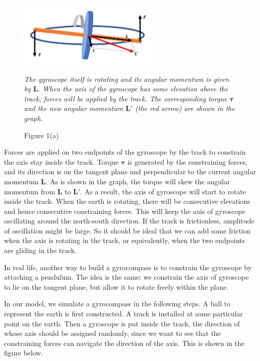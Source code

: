 \documentclass[12pt]{article}
\renewcommand{\(}{\left (}
\renewcommand{\)}{\right )}
\renewcommand{\vec}[1]{\boldsymbol{#1}}
\begin{document}
\begin {figure}[ht]
	\centering
	\includegraphics[width=0.6\textwidth]{gyrocompass_physics.png}
	\caption*{\small Figure 1(a)}
	\footnotesize
	\emph{The gyroscope itself is rotating and its angular momentum is given by $\vec{L}.$ When the axis of the gyroscope has some elevation above the track, forces will be applied by the track. The corresponding torque $\vec{\tau}$ and the new angular momentum $\vec{L'}$ (the red arrow) are shown in the graph. }
\end {figure}

Forces are applied on two endpoints of the gyroscope by the track to constrain the axis stay inside the track. Torque $\vec{\tau}$ is generated by the constraining forces, and its direction is on the tangent plane and perpendicular to the current angular momentum $\vec{L}$. As is shown in the graph, the torque will skew the angular momentum from $\vec{L}$ to $\vec{L'}.$ As a result, the axis of gyroscope will start to rotate inside the track. When the earth is rotating, there will be consecutive elevations and hence consecutive constraining forces. This will keep the axis of gyroscope oscillating around the north-south direction. If the track is frictionless, amplitude of oscillation might be large. So it should be ideal that we can add some friction when the axis is rotating in the track, or equivalently, when the two endpoints are gliding in the track.

In real life, another way to build a gyrocompass is to constrain the gyroscope by attaching a pendulum. The idea is the same: we constrain the axis of gyroscope to lie on the tangent plane, but allow it to rotate freely within the plane.

In our model, we simulate a gyrocompass in the following steps. A ball to represent the earth is first constructed. A track is installed at some particular point on the earth. Then a gyroscope is put inside the track, the direction of whose axis should be assigned randomly, since we want to see that the constraining forces can navigate the direction of the axis. This is shown in the figure below.
\end{document}
